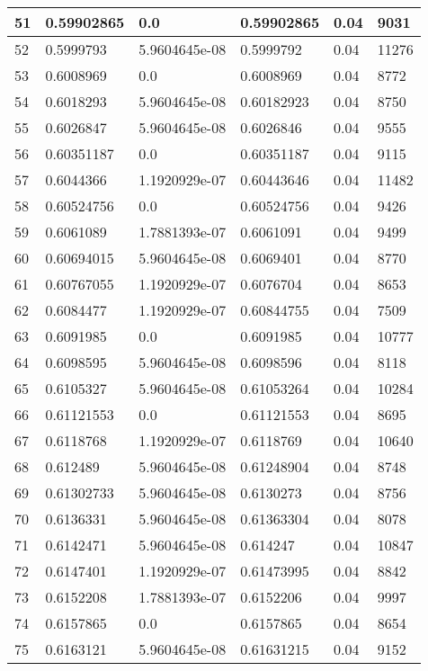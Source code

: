\begin{longtable}{|l|l|l|l|l|l|}
51 & 0.59902865 & 0.0 & 0.59902865 & 0.04 & 9031 \\ \hline 
52 & 0.5999793 & 5.9604645e-08 & 0.5999792 & 0.04 & 11276 \\ \hline 
53 & 0.6008969 & 0.0 & 0.6008969 & 0.04 & 8772 \\ \hline 
54 & 0.6018293 & 5.9604645e-08 & 0.60182923 & 0.04 & 8750 \\ \hline 
55 & 0.6026847 & 5.9604645e-08 & 0.6026846 & 0.04 & 9555 \\ \hline 
56 & 0.60351187 & 0.0 & 0.60351187 & 0.04 & 9115 \\ \hline 
57 & 0.6044366 & 1.1920929e-07 & 0.60443646 & 0.04 & 11482 \\ \hline 
58 & 0.60524756 & 0.0 & 0.60524756 & 0.04 & 9426 \\ \hline 
59 & 0.6061089 & 1.7881393e-07 & 0.6061091 & 0.04 & 9499 \\ \hline 
60 & 0.60694015 & 5.9604645e-08 & 0.6069401 & 0.04 & 8770 \\ \hline 
61 & 0.60767055 & 1.1920929e-07 & 0.6076704 & 0.04 & 8653 \\ \hline 
62 & 0.6084477 & 1.1920929e-07 & 0.60844755 & 0.04 & 7509 \\ \hline 
63 & 0.6091985 & 0.0 & 0.6091985 & 0.04 & 10777 \\ \hline 
64 & 0.6098595 & 5.9604645e-08 & 0.6098596 & 0.04 & 8118 \\ \hline 
65 & 0.6105327 & 5.9604645e-08 & 0.61053264 & 0.04 & 10284 \\ \hline 
66 & 0.61121553 & 0.0 & 0.61121553 & 0.04 & 8695 \\ \hline 
67 & 0.6118768 & 1.1920929e-07 & 0.6118769 & 0.04 & 10640 \\ \hline 
68 & 0.612489 & 5.9604645e-08 & 0.61248904 & 0.04 & 8748 \\ \hline 
69 & 0.61302733 & 5.9604645e-08 & 0.6130273 & 0.04 & 8756 \\ \hline 
70 & 0.6136331 & 5.9604645e-08 & 0.61363304 & 0.04 & 8078 \\ \hline 
71 & 0.6142471 & 5.9604645e-08 & 0.614247 & 0.04 & 10847 \\ \hline 
72 & 0.6147401 & 1.1920929e-07 & 0.61473995 & 0.04 & 8842 \\ \hline 
73 & 0.6152208 & 1.7881393e-07 & 0.6152206 & 0.04 & 9997 \\ \hline 
74 & 0.6157865 & 0.0 & 0.6157865 & 0.04 & 8654 \\ \hline 
75 & 0.6163121 & 5.9604645e-08 & 0.61631215 & 0.04 & 9152 \\ \hline 
\end{longtable}